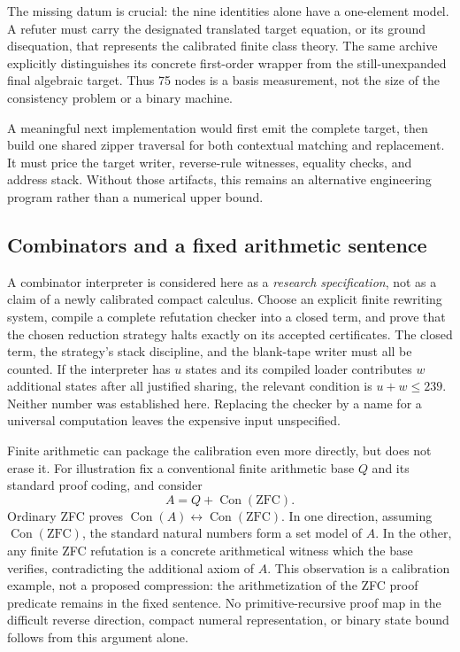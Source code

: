 The missing datum is crucial: the nine identities alone have a
one-element model.  A refuter must carry the designated translated target
equation, or its ground disequation, that represents the calibrated finite
class theory.  The same archive explicitly distinguishes its concrete
first-order wrapper from the still-unexpanded final algebraic target.
Thus 75 nodes is a basis measurement, not the size of the consistency
problem or a binary machine.

A meaningful next implementation would first emit the complete target,
then build one shared zipper traversal for both contextual matching and
replacement.  It must price the target writer, reverse-rule witnesses,
equality checks, and address stack.  Without those artifacts, this remains
an alternative engineering program rather than a numerical upper bound.

\subsection{Combinators and a fixed arithmetic sentence}

A combinator interpreter is considered here as a \emph{research
specification}, not as a claim of a newly calibrated compact calculus.
Choose an explicit finite rewriting system, compile a complete refutation
checker into a closed term, and prove that the chosen reduction strategy
halts exactly on its accepted certificates.  The closed term, the
strategy's stack discipline, and the blank-tape writer must all be counted.
If the interpreter has $u$ states and its compiled loader contributes
$w$ additional states after all justified sharing, the relevant condition
is $u+w\leq239$.  Neither number was established here.  Replacing the
checker by a name for a universal computation leaves the expensive input
unspecified.

Finite arithmetic can package the calibration even more directly, but
does not erase it.  For illustration fix a conventional finite arithmetic
base $Q$ and its standard proof coding, and consider
\[
 A=Q+\operatorname{Con}(\mathrm{ZFC}).
\]
Ordinary ZFC proves $\operatorname{Con}(A)\leftrightarrow
\operatorname{Con}(\mathrm{ZFC})$.  In one direction, assuming
$\operatorname{Con}(\mathrm{ZFC})$, the standard natural numbers form a
set model of $A$.  In the other, any finite ZFC refutation is a concrete
arithmetical witness which the base verifies, contradicting the additional
axiom of $A$.  This observation is a calibration example, not a proposed
compression: the arithmetization of the ZFC proof predicate remains in the
fixed sentence.  No primitive-recursive proof map in the difficult reverse
direction, compact numeral representation, or binary state bound follows
from this argument alone.

